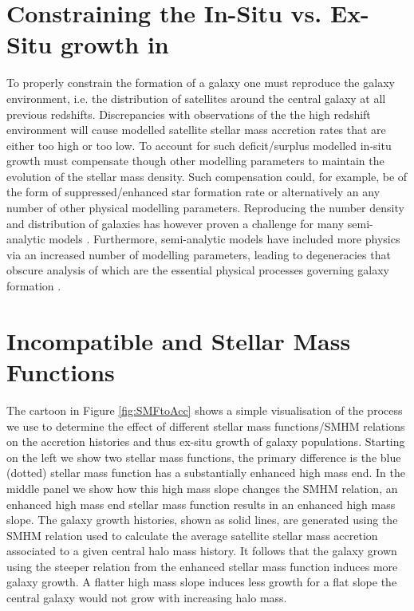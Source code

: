 \section{Constraining the In-Situ vs. Ex-Situ growth in \steel}
To properly constrain the formation of a galaxy one must reproduce the galaxy environment, i.e. the distribution of satellites around the central galaxy at all previous redshifts. Discrepancies with observations of the the high redshift environment will cause modelled satellite stellar mass accretion rates that are either too high or too low. To account for such deficit/surplus modelled in-situ growth must compensate though other modelling parameters to maintain the evolution of the stellar mass density. Such compensation could, for example, be of the form of suppressed/enhanced star formation rate or alternatively an any number of other physical modelling parameters. Reproducing the number density and distribution of galaxies has however proven a challenge for many semi-analytic models \citep[e.g.][]{Asquith2018CosmicModels}. Furthermore, semi-analytic models have included more physics via an increased number of modelling parameters, leading to degeneracies that obscure analysis of which are the essential physical processes governing galaxy formation \citep[e.g.][]{Lapi2011Herschel-atlasGalaxies, Gonzalez2011Evolution4}.


\section{Incompatible \LCDM and Stellar Mass Functions}
The cartoon in Figure \ref{fig:SMFtoAcc} shows a simple visualisation of the process we use to determine the effect of different stellar mass functions/SMHM relations on the accretion histories and thus ex-situ growth of galaxy populations. Starting on the left we show two stellar mass functions, the primary difference is the blue (dotted) stellar mass function has a substantially enhanced high mass end. In the middle panel we show how this high mass slope changes the SMHM relation, an enhanced high mass end stellar mass function results in an enhanced high mass slope. The galaxy growth histories, shown as solid lines, are generated using the SMHM relation used to calculate the average satellite stellar mass accretion associated to a given central halo mass history.
It follows that the galaxy grown using the steeper relation from the enhanced stellar mass function induces more galaxy growth. A flatter high mass slope induces less growth for a flat slope the central galaxy would not grow with increasing halo mass.

